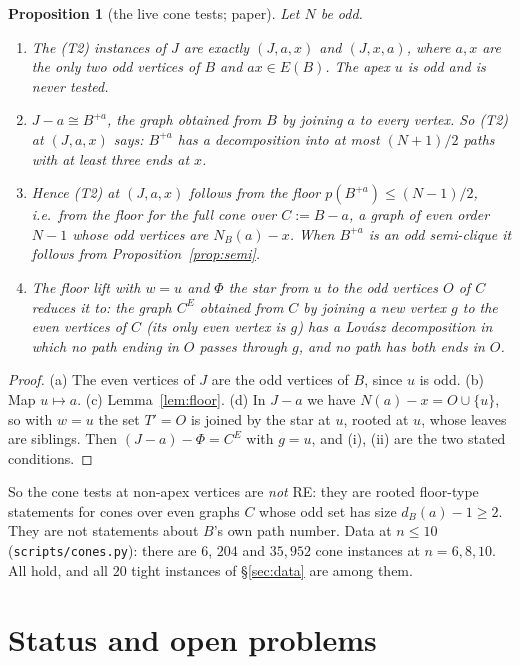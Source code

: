 \documentclass[11pt]{amsart}
\newtheorem{proposition}[theorem]{Proposition}
\theoremstyle{definition}
\theoremstyle{remark}
\renewcommand{\_}{\oldunderscore\allowbreak}
\begin{document}
\begin{proposition}[the live cone tests; paper]\label{prop:cone}
Let $N$ be odd.
\begin{enumerate}[label=(\alph*)]
\item The (T2) instances of $J$ are exactly $(J,a,x)$ and $(J,x,a)$, where $a,x$ are the only two odd
vertices of $B$ and $ax\in E(B)$. The apex $u$ is odd and is never tested.
\item $J-a\cong B^{+a}$, the graph obtained from $B$ by joining $a$ to every vertex. So (T2) at
$(J,a,x)$ says: $B^{+a}$ has a decomposition into at most $(N+1)/2$ paths with at least three ends
at $x$.
\item Hence (T2) at $(J,a,x)$ follows from the floor $p(B^{+a})\le(N-1)/2$, i.e.\ from the floor for
the full cone over $C:=B-a$, a graph of even order $N-1$ whose odd vertices are $N_B(a)-x$. When
$B^{+a}$ is an odd semi-clique it follows from Proposition~\ref{prop:semi}.
\item The floor lift with $w=u$ and $\Phi$ the star from $u$ to the odd vertices $O$ of $C$ reduces
it to: the graph $C^E$ obtained from $C$ by joining a new vertex $g$ to the even vertices of $C$ (its
only even vertex is $g$) has a Lov\'asz decomposition in which no path ending in $O$ passes through
$g$, and no path has both ends in $O$.
\end{enumerate}
\end{proposition}

\begin{proof}
(a) The even vertices of $J$ are the odd vertices of $B$, since $u$ is odd. (b) Map $u\mapsto a$. (c)
Lemma~\ref{lem:floor}. (d) In $J-a$ we have $N(a)-x=O\cup\{u\}$, so with $w=u$ the set $T'=O$ is joined by
the star at $u$, rooted at $u$, whose leaves are siblings. Then $(J-a)-\Phi=C^E$ with $g=u$, and (i),
(ii) are the two stated conditions.
\end{proof}

So the cone tests at non-apex vertices are \emph{not} RE: they are rooted floor-type statements for
cones over even graphs $C$ whose odd set has size $d_B(a)-1\ge2$. They are not statements about $B$'s
own path number. Data at $n\le10$ (\texttt{scripts/cones.py}): there are $6$, $204$ and $35{,}952$ cone
instances at $n=6,8,10$. All hold, and all $20$ tight instances of \S\ref{sec:data} are among them.

\section{Status and open problems}\label{sec:status}
\end{document}
